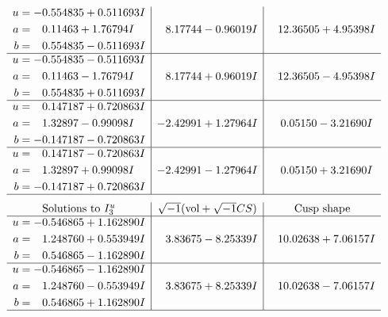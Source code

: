 \documentclass[1p]{elsarticle_modified}
\theoremstyle{definition}
\newcommand{\I}{\sqrt{-1}}
\begin{document}
$$\begin{array}{c|c|c}
\begin{aligned}
u &= -0.554835 + 0.511693 I \\
a &= \phantom{-}0.11463 + 1.76794 I \\
b &= \phantom{-}0.554835 - 0.511693 I\end{aligned}
 & \phantom{-}8.17744 - 0.96019 I & \phantom{-}12.36505 + 4.95398 I \\ \hline\begin{aligned}
u &= -0.554835 - 0.511693 I \\
a &= \phantom{-}0.11463 - 1.76794 I \\
b &= \phantom{-}0.554835 + 0.511693 I\end{aligned}
 & \phantom{-}8.17744 + 0.96019 I & \phantom{-}12.36505 - 4.95398 I \\ \hline\begin{aligned}
u &= \phantom{-}0.147187 + 0.720863 I \\
a &= \phantom{-}1.32897 - 0.99098 I \\
b &= -0.147187 - 0.720863 I\end{aligned}
 & -2.42991 + 1.27964 I & \phantom{-}0.05150 - 3.21690 I \\ \hline\begin{aligned}
u &= \phantom{-}0.147187 - 0.720863 I \\
a &= \phantom{-}1.32897 + 0.99098 I \\
b &= -0.147187 + 0.720863 I\end{aligned}
 & -2.42991 - 1.27964 I & \phantom{-}0.05150 + 3.21690 I\\
 \hline 
 \end{array}$$\newpage$$\begin{array}{c|c|c}  
\text{Solutions to }I^u_{3}& \I (\text{vol} + \sqrt{-1}CS) & \text{Cusp shape}\\
 \hline 
\begin{aligned}
u &= -0.546865 + 1.162890 I \\
a &= \phantom{-}1.248760 + 0.553949 I \\
b &= \phantom{-}0.546865 - 1.162890 I\end{aligned}
 & \phantom{-}3.83675 - 8.25339 I & \phantom{-}10.02638 + 7.06157 I \\ \hline\begin{aligned}
u &= -0.546865 - 1.162890 I \\
a &= \phantom{-}1.248760 - 0.553949 I \\
b &= \phantom{-}0.546865 + 1.162890 I\end{aligned}
 & \phantom{-}3.83675 + 8.25339 I & \phantom{-}10.02638 - 7.06157 I\\
 \hline 
 \end{array}$$\newpage\newpage\renewcommand{\arraystretch}{1}
\end{document}
